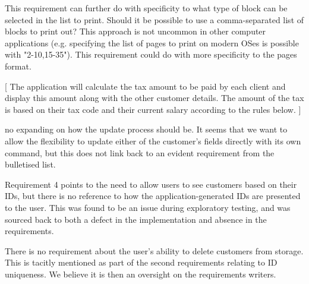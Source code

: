 This requirement can further do with specificity to what type of block can be selected in the list to print. 
Should it be possible to use a comma-separated list of blocks to print out? This approach is not uncommon in other computer applications (e.g. specifying the list of pages to print on modern OSes is possible with "2-10,15-35"). This requirement could do with more specificity to the pages format. 

[ The application will calculate the tax amount to be paid by each client and display this
amount along with the other customer details. The amount of the tax is based on their tax
code and their current salary according to the rules below. ]



no expanding on how the update process should be. It seems that we want to allow the flexibility to update either of the customer's fields directly with its own command, but this does not link back to an evident requirement from the bulletised list. 


Requirement 4 points to the need to allow users to see customers based on their IDs, but there is no reference to how the application-generated IDs are presented to the user. This was found to be an issue during exploratory testing, and was sourced back to both a defect in the implementation and absence in the requirements. 

There is no requirement about the user's ability to delete customers from storage. This is tacitly mentioned as part of the second requirements relating to ID uniqueness. We believe it is then an oversight on the requirements writers. 

